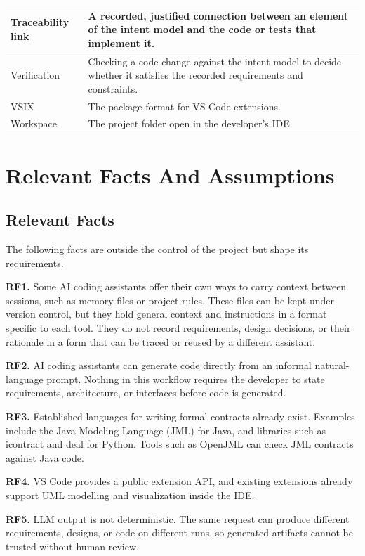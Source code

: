\documentclass[12pt]{article}
\begin{document}
{\begin{longtable}{|>{\raggedright\arraybackslash}p{3.4cm}|p{8.9cm}|}
Traceability link & A recorded, justified connection between an element of the intent model and the code or tests that implement it.\\ \hline
Verification & Checking a code change against the intent model to decide whether it satisfies the recorded requirements and constraints.\\ \hline
VSIX & The package format for VS Code extensions.\\ \hline
Workspace & The project folder open in the developer's IDE.\\ \hline
\end{longtable}}

\section{Relevant Facts And Assumptions}
\subsection{Relevant Facts}

The following facts are outside the control of the project but shape its
requirements.

\medskip
\noindent\textbf{RF1.} Some AI coding assistants offer their own ways to carry
context between sessions, such as memory files or project rules. These files
can be kept under version control, but they hold general context and
instructions in a format specific to each tool. They do not record
requirements, design decisions, or their rationale in a form that can be traced
or reused by a different assistant.

\medskip
\noindent\textbf{RF2.} AI coding assistants can generate code directly from an
informal natural-language prompt. Nothing in this workflow requires the
developer to state requirements, architecture, or interfaces before code is
generated.

\medskip
\noindent\textbf{RF3.} Established languages for writing formal contracts
already exist. Examples include the Java Modeling Language (JML) for Java, and
libraries such as icontract and deal for Python. Tools such as OpenJML can check
JML contracts against Java code.

\medskip
\noindent\textbf{RF4.} VS Code provides a public extension API, and existing
extensions already support UML modelling and visualization inside the IDE.

\medskip
\noindent\textbf{RF5.} LLM output is not deterministic. The same request can
produce different requirements, designs, or code on different runs, so
generated artifacts cannot be trusted without human review.
\end{document}

